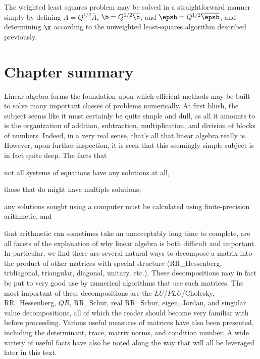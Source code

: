 The weighted least squares problem may be solved in a straightforward
manner simply by defining $A=Q^{1/2} \overline{A}$, $\b=Q^{1/2}
\overline{\b}$, and $\epsb=Q^{1/2} \overline{\epsb}$, and determining
$\x$ according to the unweighted least-squares algorithm
described previously.

%
%
%
%

\section{Chapter summary}

Linear algebra forms the foundation upon which efficient methods may
be built to solve many important classes of problems numerically.  
At first blush, the subject seems like it must certainly be quite simple and dull, as all it amounts to is
the organization of addition, subtraction, multiplication, and division of blocks
of numbers.  Indeed, in a very real sense, that's all that linear algebra really is.
However, upon further inspection, it is seen that this seemingly simple subject is in fact quite
deep.  The facts that
\beginmylistb
\item not all systems of equations have any solutions at all,
\item those that do might have multiple solutions,
\item any solutions sought using a computer must be calculated using finite-precision arithmetic, and
\item that arithmetic can sometimes take an unacceptably long time to complete,
\endmylist
\noindent are all facets of the explanation of why linear algebra is both difficult and important.  In particular,
we find there are several natural ways to decompose a matrix into the product of other matrices with
special structure (RR_Hessenberg, tridiagonal, triangular, diagonal, unitary, etc.).  These decompositions
may in fact be put to very good use by numerical algorithms that use such matrices.  The most
important of these decompositions are the $LU$/$PLU$/Cholesky, RR_Hessenberg, $QR$, RR_Schur, real RR_Schur, eigen,
Jordan, and singular value decompositions, all of which the reader should become very familiar with before proceeding.  
Various useful measures of matrices have also been presented, including the determinant, trace, matrix norms,
and condition number. A wide variety of useful facts have also be noted along the way that will all be leveraged later in this text.

